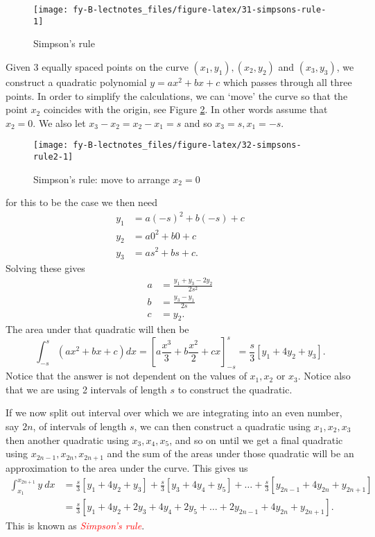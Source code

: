 \documentclass[
  11pt,
  oneside]{book}
\newcommand{\slide}{}
\theoremstyle{definition}
\theoremstyle{definition}
\theoremstyle{definition}
\theoremstyle{definition}
\theoremstyle{remark}
\begin{document}
\begin{figure}

{\centering \texttt{[image: fy-B-lectnotes\_files/figure-latex/31-simpsons-rule-1]} 

}

\caption{Simpson's rule}\label{fig:31-simpsons-rule}
\end{figure}

Given 3 equally spaced points on the curve \((x_1,y_1), (x_2, y_2)\) and \((x_3,y_3)\), we construct a quadratic polynomial \(y=ax^2+bx+c\) which passes through all three points. In order to simplify the calculations, we can `move' the curve so that the point \(x_2\) coincides with the origin, see Figure \ref{fig:32-simpsons-rule2}. In other words assume that \(x_2=0\). We also let \(x_3-x_2=x_2-x_1=s\) and so \(x_3=s, x_1=-s\).

\begin{figure}

{\centering \texttt{[image: fy-B-lectnotes\_files/figure-latex/32-simpsons-rule2-1]} 

}

\caption{Simpson's rule: move to arrange $x_2=0$}\label{fig:32-simpsons-rule2}
\end{figure}

for this to be the case we then need
\begin{align*}
y_1&=a(-s)^2+b(-s)+c\\
y_2&=a0^2+b0+c\\
y_3&=as^2+bs+c.
\end{align*}
Solving these gives
\begin{align*}
a&=\frac{y_1+y_3-2y_2}{2s^2}\\
b&=\frac{y_3-y_1}{2s}\\
c&=y_2.
\end{align*}
The area under that quadratic will then be
\[
\int_{-s}^{s}(ax^2+bx+c)dx = \left[a\frac{x^3}3+b\frac{x^2}2+cx\right]_{-s}^{s}=\frac{s}{3}\left[y_1+4y_2+y_3\right].
\]
Notice that the answer is not dependent on the values of \(x_1, x_2\) or \(x_3\). Notice also that we are using 2 intervals of length \(s\) to construct the quadratic.

If we now split out interval over which we are integrating into an even number, say \(2n\), of intervals of length \(s\), we can then construct a quadratic using \(x_1, x_2, x_3\) then another quadratic using \(x_3, x_4, x_5\), and so on until we get a final quadratic using \(x_{2n-1},x_{2n},x_{2n+1}\) and the sum of the areas under those quadratic will be an approximation to the area under the curve. This gives us
\begin{align*}
\int_{x_1}^{x_{2n+1}}y\ dx& = \frac s3\left[y_1+4y_2+y_3\right] + \frac s3\left[y_3+4y_4+y_5\right] + \ldots + \frac s3\left[y_{2n-1}+4y_{2n}+y_{2n+1}\right]\\
&=\frac s3\left[y_1+4y_2+2y_3+4y_4+2y_5+\ldots +2y_{2n-1}+4y_{2n}+y_{2n+1}\right].
\end{align*}
This is known as \textcolor{red}{\em Simpson's rule}.
\slide
\end{document}
